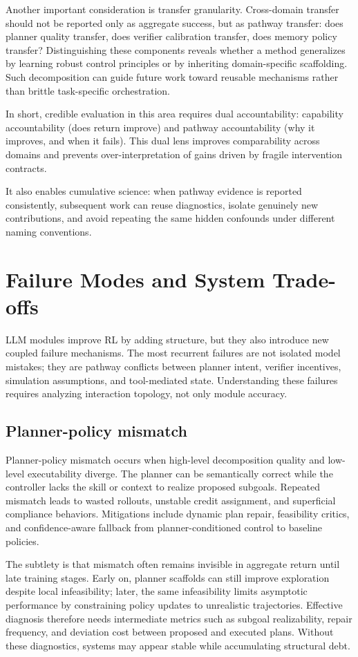 \documentclass[pdflatex,sn-mathphys-num]{sn-jnl}
\begin{document}
Another important consideration is transfer granularity. Cross-domain transfer should not be reported only as aggregate success, but as pathway transfer: does planner quality transfer, does verifier calibration transfer, does memory policy transfer? Distinguishing these components reveals whether a method generalizes by learning robust control principles or by inheriting domain-specific scaffolding. Such decomposition can guide future work toward reusable mechanisms rather than brittle task-specific orchestration.

In short, credible evaluation in this area requires dual accountability: capability accountability (does return improve) and pathway accountability (why it improves, and when it fails). This dual lens improves comparability across domains and prevents over-interpretation of gains driven by fragile intervention contracts.

It also enables cumulative science: when pathway evidence is reported consistently, subsequent work can reuse diagnostics, isolate genuinely new contributions, and avoid repeating the same hidden confounds under different naming conventions.

\section{Failure Modes and System Trade-offs}
LLM modules improve RL by adding structure, but they also introduce new coupled failure mechanisms. The most recurrent failures are not isolated model mistakes; they are pathway conflicts between planner intent, verifier incentives, simulation assumptions, and tool-mediated state. Understanding these failures requires analyzing interaction topology, not only module accuracy.

\subsection{Planner-policy mismatch}
Planner-policy mismatch occurs when high-level decomposition quality and low-level executability diverge. The planner can be semantically correct while the controller lacks the skill or context to realize proposed subgoals. Repeated mismatch leads to wasted rollouts, unstable credit assignment, and superficial compliance behaviors. Mitigations include dynamic plan repair, feasibility critics, and confidence-aware fallback from planner-conditioned control to baseline policies.

The subtlety is that mismatch often remains invisible in aggregate return until late training stages. Early on, planner scaffolds can still improve exploration despite local infeasibility; later, the same infeasibility limits asymptotic performance by constraining policy updates to unrealistic trajectories. Effective diagnosis therefore needs intermediate metrics such as subgoal realizability, repair frequency, and deviation cost between proposed and executed plans. Without these diagnostics, systems may appear stable while accumulating structural debt.
\end{document}
